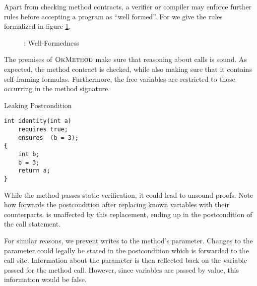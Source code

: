 Apart from checking method contracts, a verifier or compiler may enforce further rules before accepting a program as “well formed”.
For \svlidf we give the rules formalized in figure \ref{fig:idf-wf}.

\begin{figure}[h]
    
    \caption{\svlidf: Well-Formedness}
    \label{fig:idf-wf}
\end{figure}

The premises of $\textup{\textsc{OkMethod}}$ make sure that reasoning about calls is sound.
As expected, the method contract is checked, while also making sure that it contains self-framing formulas.
Furthermore, the free variables are restricted to those occurring in the method signature.

\begin{example}{Leaking Postcondition}
\begin{lstlisting}
int identity(int a)
    requires true;
    ensures  (b = 3);
{
    int b;
    b = 3;
    return a;
}
\end{lstlisting}
While the method passes static verification, it could lead to unsound proofs.
Note how  forwards the postcondition after replacing known variables with their counterparts.
 is unaffected by this replacement, ending up in the postcondition of the call statement.
\end{example}

For similar reasons, we prevent writes to the method's parameter.
Changes to the parameter could legally be stated in the postcondition which is forwarded to the call site.
Information about the parameter is then reflected back on the variable passed for the method call.
However, since variables are passed by value, this information would be false.